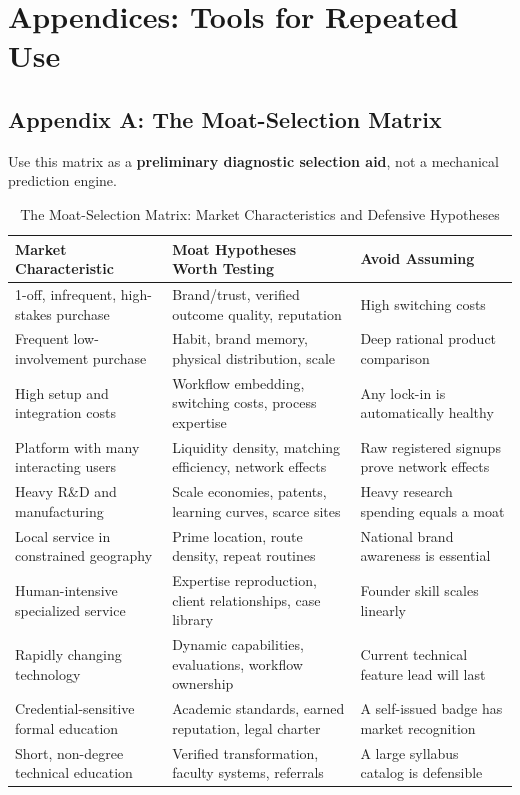 \section*{Appendices: Tools for Repeated Use}
\label{sec:appendices_tools_repeated_use}

\subsection*{Appendix A: The Moat-Selection Matrix}
\label{sec:appendix_a_moat_selection_matrix}

Use this matrix as a \textbf{preliminary diagnostic selection aid}, not a mechanical prediction engine.

\begin{table}[t]
\centering
\small
\caption{The Moat-Selection Matrix: Market Characteristics and Defensive Hypotheses}
\label{tab:moat_selection_matrix}
\begin{tabularx}{\textwidth}{p{3.6cm} X p{4.2cm}}
\toprule
\textbf{Market Characteristic} & \textbf{Moat Hypotheses Worth Testing} & \textbf{Avoid Assuming} \\
\midrule
1-off, infrequent, high-stakes purchase & Brand/trust, verified outcome quality, reputation & High switching costs \\
\addlinespace[2pt]
Frequent low-involvement purchase & Habit, brand memory, physical distribution, scale & Deep rational product comparison \\
\addlinespace[2pt]
High setup and integration costs & Workflow embedding, switching costs, process expertise & Any lock-in is automatically healthy \\
\addlinespace[2pt]
Platform with many interacting users & Liquidity density, matching efficiency, network effects & Raw registered signups prove network effects \\
\addlinespace[2pt]
Heavy R\&D and manufacturing & Scale economies, patents, learning curves, scarce sites & Heavy research spending equals a moat \\
\addlinespace[2pt]
Local service in constrained geography & Prime location, route density, repeat routines & National brand awareness is essential \\
\addlinespace[2pt]
Human-intensive specialized service & Expertise reproduction, client relationships, case library & Founder skill scales linearly \\
\addlinespace[2pt]
Rapidly changing technology & Dynamic capabilities, evaluations, workflow ownership & Current technical feature lead will last \\
\addlinespace[2pt]
Credential-sensitive formal education & Academic standards, earned reputation, legal charter & A self-issued badge has market recognition \\
\addlinespace[2pt]
Short, non-degree technical education & Verified transformation, faculty systems, referrals & A large syllabus catalog is defensible \\
\bottomrule
\end{tabularx}
\end{table}

